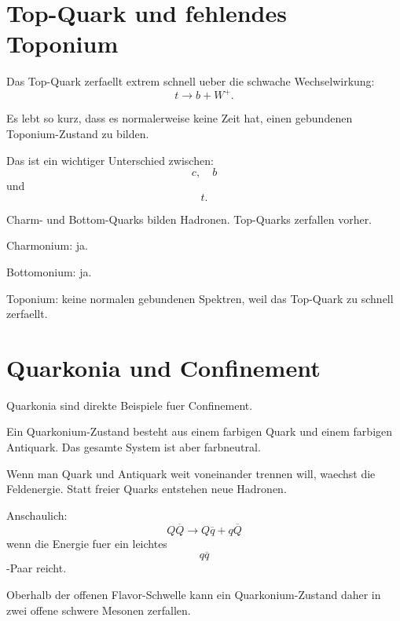 \section{Top-Quark und fehlendes Toponium}

\begin{conceptbox}
Das Top-Quark zerfaellt extrem schnell ueber die schwache Wechselwirkung:
\[
    t \rightarrow b + W^+.
\]

Es lebt so kurz, dass es normalerweise keine Zeit hat, einen gebundenen
Toponium-Zustand zu bilden.
\end{conceptbox}

\begin{notebox}
Das ist ein wichtiger Unterschied zwischen:
\[
    c,\quad b
\]
und
\[
    t.
\]

Charm- und Bottom-Quarks bilden Hadronen.
Top-Quarks zerfallen vorher.
\end{notebox}

\begin{examtipbox}
Charmonium:
ja.

Bottomonium:
ja.

Toponium:
keine normalen gebundenen Spektren, weil das Top-Quark zu schnell zerfaellt.
\end{examtipbox}

\section{Quarkonia und Confinement}

Quarkonia sind direkte Beispiele fuer Confinement.

\begin{conceptbox}
Ein Quarkonium-Zustand besteht aus einem farbigen Quark und einem farbigen Antiquark.
Das gesamte System ist aber farbneutral.

Wenn man Quark und Antiquark weit voneinander trennen will, waechst die Feldenergie.
Statt freier Quarks entstehen neue Hadronen.
\end{conceptbox}

\begin{formulabox}
Anschaulich:
\[
    Q\overline{Q}
    \rightarrow
    Q\overline{q}
    +
    q\overline{Q}
\]
wenn die Energie fuer ein leichtes
\[
    q\overline{q}
\]
-Paar reicht.
\end{formulabox}

\begin{conceptbox}
Oberhalb der offenen Flavor-Schwelle kann ein Quarkonium-Zustand daher in zwei
offene schwere Mesonen zerfallen.
\end{conceptbox}

